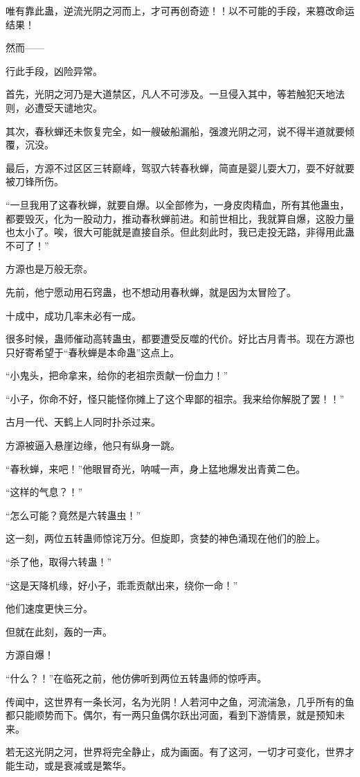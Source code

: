 \begin{this_body}
唯有靠此蛊，逆流光阴之河而上，才可再创奇迹！！以不可能的手段，来篡改命运结果！

然而——

行此手段，凶险异常。

首先，光阴之河乃是大道禁区，凡人不可涉及。一旦侵入其中，等若触犯天地法则，必遭受天谴地灾。

其次，春秋蝉还未恢复完全，如一艘破船漏船，强渡光阴之河，说不得半道就要倾覆，沉没。

最后，方源不过区区三转巅峰，驾驭六转春秋蝉，简直是婴儿耍大刀，耍不好就要被刀锋所伤。

“一旦我用了这春秋蝉，就要自爆。以全部修为，一身皮肉精血，所有其他蛊虫，都要毁灭，化为一股动力，推动春秋蝉前进。和前世相比，我就算自爆，这股力量也太小了。唉，很大可能就是直接自杀。但此刻此时，我已走投无路，非得用此蛊不可了！”

方源也是万般无奈。

先前，他宁愿动用石窍蛊，也不想动用春秋蝉，就是因为太冒险了。

十成中，成功几率未必有一成。

很多时候，蛊师催动高转蛊虫，都要遭受反噬的代价。好比古月青书。现在方源也只好寄希望于“春秋蝉是本命蛊”这点上。

“小鬼头，把命拿来，给你的老祖宗贡献一份血力！”

“小子，你命不好，怪只能怪你摊上了这个卑鄙的祖宗。我来给你解脱了罢！！”

古月一代、天鹤上人同时扑杀过来。

方源被逼入悬崖边缘，他只有纵身一跳。

“春秋蝉，来吧！”他眼冒奇光，呐喊一声，身上猛地爆发出青黄二色。

“这样的气息？！”

“怎么可能？竟然是六转蛊虫！”

这一刻，两位五转蛊师惊诧万分。但旋即，贪婪的神色涌现在他们的脸上。

“杀了他，取得六转蛊！”

“这是天降机缘，好小子，乖乖贡献出来，绕你一命！”

他们速度更快三分。

但就在此刻，轰的一声。

方源自爆！

“什么？！”在临死之前，他仿佛听到两位五转蛊师的惊呼声。

传闻中，这世界有一条长河，名为光阴！人若河中之鱼，河流湍急，几乎所有的鱼都只能顺势而下。偶尔，有一两只鱼偶尔跃出河面，看到下游情景，就是预知未来。

若无这光阴之河，世界将完全静止，成为画面。有了这河，一切才可变化，世界才能生动，或是衰减或是繁华。


\end{this_body}
